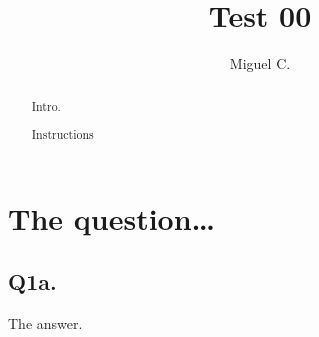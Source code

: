 \documentclass[a4paper]{tufte-handout}
\title[Test]{Test 00}
\author[M.C.]{Miguel C.}
\date %
\newcommand{\teacherspace}[0]{\vspace*{5em}}
\begin{document}
\maketitle%

\begin{abstract}
\noindent
Intro.
\end{abstract}

\section{The question\dots}\label{sec:q1}
\begin{abstract}
\noindent
Instructions
\end{abstract}

\subsection{Q1a.}\label{ssec:q1a}
The answer.

\teacherspace
\pagebreak

\nobibliography{}
\end{document}
